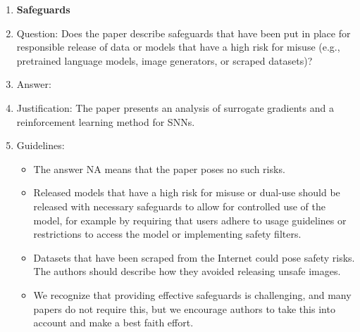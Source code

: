 \documentclass{article}
\begin{document}
\begin{enumerate}
\item {\bf Safeguards}
    \item[] Question: Does the paper describe safeguards that have been put in place for responsible release of data or models that have a high risk for misuse (e.g., pretrained language models, image generators, or scraped datasets)?
    \item[] Answer: \answerNA{} %
    \item[] Justification: The paper presents an analysis of surrogate gradients and a reinforcement learning method for SNNs.
    \item[] Guidelines:
    \begin{itemize}
        \item The answer NA means that the paper poses no such risks.
        \item Released models that have a high risk for misuse or dual-use should be released with necessary safeguards to allow for controlled use of the model, for example by requiring that users adhere to usage guidelines or restrictions to access the model or implementing safety filters. 
        \item Datasets that have been scraped from the Internet could pose safety risks. The authors should describe how they avoided releasing unsafe images.
        \item We recognize that providing effective safeguards is challenging, and many papers do not require this, but we encourage authors to take this into account and make a best faith effort.
    \end{itemize}


\end{enumerate}
\end{document}
